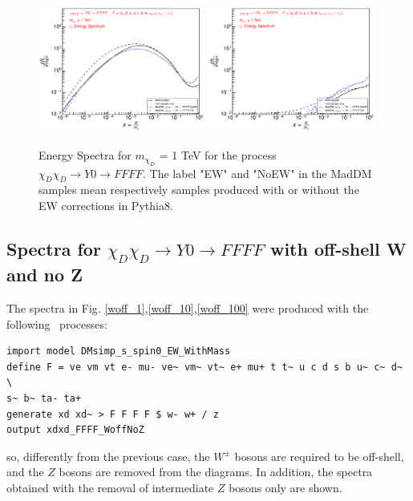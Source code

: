 \documentclass[epj,nopacs,fleqn]{svjour}
\begin{document}
\begin{figure}[!b]
\subfigure
{ \includegraphics[width=0.49\textwidth]{Fig/xdxd_Y0/1_neutrinos_mu_FFFF_xdxd_1.pdf}}
\subfigure
{ \includegraphics[width=0.49\textwidth]{Fig/xdxd_Y0/1_neutrinos_tau_FFFF_xdxd_1.pdf}}
\caption{Energy Spectra for $m_{\chi_D}$ = 1 TeV for the process $\chi_D \chi_D \rightarrow Y0 \rightarrow FFFF$. The label "EW" and "NoEW" in the MadDM samples mean respectively samples produced with or without the EW corrections in Pythia8.}
\end{figure}


\clearpage
\subsection{Spectra for $\chi_D \chi_D \rightarrow Y0 \rightarrow FFFF$ with off-shell W and no Z}
The spectra in Fig. \ref{woff_1},\ref{woff_10},\ref{woff_100} were produced with the following \MG~processes:
\begin{verbatim}
import model DMsimp_s_spin0_EW_WithMass
define F = ve vm vt e- mu- ve~ vm~ vt~ e+ mu+ t t~ u c d s b u~ c~ d~ \
s~ b~ ta- ta+
generate xd xd~ > F F F F $ w- w+ / z
output xdxd_FFFF_WoffNoZ
\end{verbatim}
so, differently from the previous case, the $W^{\pm }$ bosons are required to be off-shell, and the $Z$ bosons are removed from the diagrams. In addition, the spectra obtained with the removal of intermediate $Z$ bosons only are shown.
\end{document}
